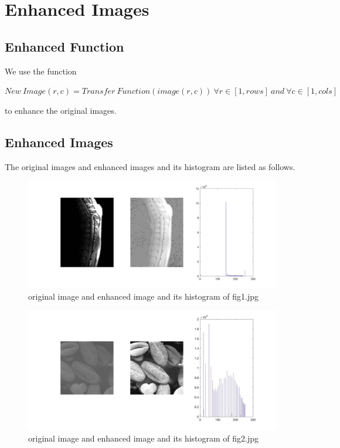 \documentclass[11pt,oneside]{book}
\begin{document}
\section{Enhanced Images}
\subsection{Enhanced Function}
We use the function\\
\begin{center}
$New\ Image(r,c) = Transfer\ Function(image(r,c))\ \forall r \in [1,rows]\ and\ \forall c \in [1,cols]$
\end{center}
to enhance the original images. 
\subsection{Enhanced Images}
The original images and enhanced images and its histogram are listed as follows.
\begin{figure}[!htb]
   \centering  
   \includegraphics[width=1.0\textwidth]{images/1/image1.jpg}
   \caption{original image and enhanced image and its histogram of fig1.jpg}  
\end{figure}
\begin{figure}[!htb]
   \centering  
   \includegraphics[width=1.0\textwidth]{images/1/image2.jpg}
   \caption{original image and enhanced image and its histogram of fig2.jpg}  
\end{figure}
\end{document}
